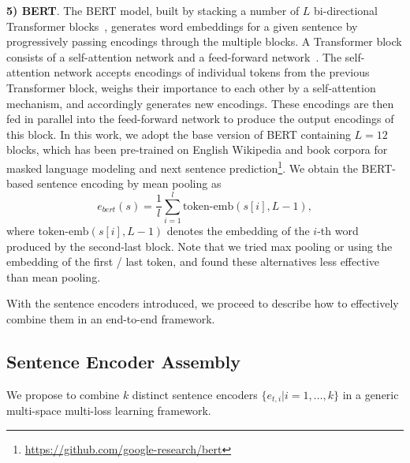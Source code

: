 \textbf{5) BERT}. The BERT model, built by stacking a number of $L$ bi-directional Transformer blocks~\cite{bert}, generates word embeddings for a given sentence by progressively passing encodings through the multiple blocks. A Transformer block consists of a self-attention network and a feed-forward network~\cite{transformer}. The self-attention network accepts encodings of individual tokens from the previous Transformer block, weighs their importance to each other by a self-attention mechanism, and accordingly generates new encodings. These encodings are then fed in parallel into the feed-forward network to produce the output encodings of this block. In this work, we adopt the base version of BERT containing $L=12$ blocks, which has been pre-trained on English Wikipedia and book corpora for masked language modeling and next sentence prediction\footnote{\url{https://github.com/google-research/bert}\label{bert}}. We obtain the BERT-based sentence encoding by mean pooling as 
\begin{equation} \label{eq:bert}
e_{bert}(s)=\frac{1}{l} \sum_{i=1}^{l} \mbox{token-emb}(s[i], L-1),
\end{equation}
where $\mbox{token-emb}(s[i], L-1)$ denotes the embedding of the $i$-th word produced by the second-last block. Note that we tried max pooling or using the embedding of the first / last token, and found these alternatives less effective than mean pooling.




With the sentence encoders introduced, we proceed to describe how to effectively combine them in an end-to-end framework.

\subsection{Sentence Encoder Assembly} \label{ssec:tea}

We propose to combine $k$ distinct sentence encoders $\{e_{t,i}|i=1,\ldots,k\}$ in a generic multi-space multi-loss learning framework. 

